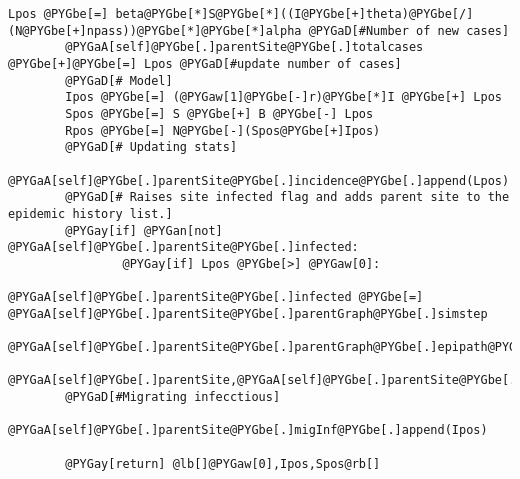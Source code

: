 \documentclass[a4paper,10pt]{manual}
\begin{document}
\begin{Verbatim}[commandchars=@\[\]]
        Lpos @PYGbe[=] beta@PYGbe[*]S@PYGbe[*]((I@PYGbe[+]theta)@PYGbe[/](N@PYGbe[+]npass))@PYGbe[*]@PYGbe[*]alpha @PYGaD[#Number of new cases]
        @PYGaA[self]@PYGbe[.]parentSite@PYGbe[.]totalcases @PYGbe[+]@PYGbe[=] Lpos @PYGaD[#update number of cases]
        @PYGaD[# Model]
        Ipos @PYGbe[=] (@PYGaw[1]@PYGbe[-]r)@PYGbe[*]I @PYGbe[+] Lpos
        Spos @PYGbe[=] S @PYGbe[+] B @PYGbe[-] Lpos
        Rpos @PYGbe[=] N@PYGbe[-](Spos@PYGbe[+]Ipos)
        @PYGaD[# Updating stats]
        @PYGaA[self]@PYGbe[.]parentSite@PYGbe[.]incidence@PYGbe[.]append(Lpos)
        @PYGaD[# Raises site infected flag and adds parent site to the epidemic history list.]
        @PYGay[if] @PYGan[not] @PYGaA[self]@PYGbe[.]parentSite@PYGbe[.]infected:
                @PYGay[if] Lpos @PYGbe[>] @PYGaw[0]:
                        @PYGaA[self]@PYGbe[.]parentSite@PYGbe[.]infected @PYGbe[=] @PYGaA[self]@PYGbe[.]parentSite@PYGbe[.]parentGraph@PYGbe[.]simstep
                        @PYGaA[self]@PYGbe[.]parentSite@PYGbe[.]parentGraph@PYGbe[.]epipath@PYGbe[.]append((@PYGaA[self]@PYGbe[.]parentSite@PYGbe[.]parentGraph@PYGbe[.]simstep,
                        @PYGaA[self]@PYGbe[.]parentSite,@PYGaA[self]@PYGbe[.]parentSite@PYGbe[.]infector))
        @PYGaD[#Migrating infecctious]
        @PYGaA[self]@PYGbe[.]parentSite@PYGbe[.]migInf@PYGbe[.]append(Ipos)

        @PYGay[return] @lb[]@PYGaw[0],Ipos,Spos@rb[]
\end{Verbatim}
\end{document}
